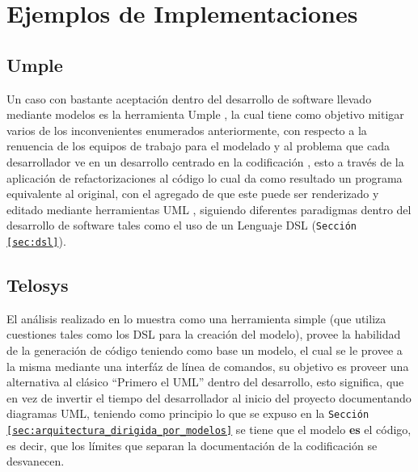 \section{Ejemplos de Implementaciones}

\subsection{Umple}
Un caso con bastante aceptación dentro del desarrollo de software llevado
mediante modelos es la herramienta Umple {\cite{umple-official}}, la cual tiene
como objetivo mitigar varios de los inconvenientes enumerados anteriormente, con
respecto a la renuencia de los equipos de trabajo para el modelado y al
problema que cada desarrollador ve en un desarrollo centrado en la
codificación \cites{aldaeej2016}{garzon2014}, esto a través de la aplicación de
refactorizaciones al código lo cual da como resultado un programa equivalente
al original, con el agregado de que este puede ser renderizado y editado
mediante herramientas UML \cite{lethbridge2010}, siguiendo diferentes
paradigmas dentro del desarrollo de software tales como el uso de un Lenguaje
DSL (\texttt{Sección \ref{sec:dsl}}).

\subsection{Telosys}
El análisis realizado en \cite{telosys} lo muestra como una herramienta simple
(que utiliza cuestiones tales como los DSL para la creación del modelo),
provee la habilidad de la generación de código teniendo como base un modelo,
el cual se le provee a la misma mediante una interfáz de línea de comandos, su
objetivo es proveer una alternativa al clásico ``Primero el UML'' dentro del
desarrollo, esto significa, que en vez de invertir el tiempo del
desarrollador al inicio del proyecto documentando diagramas UML, teniendo como
principio lo que se expuso en la \texttt{Sección
\ref{sec:arquitectura_dirigida_por_modelos}} se
tiene que el modelo \textbf{es} el código, es decir, que los límites que separan
la documentación de la codificación se desvanecen.



